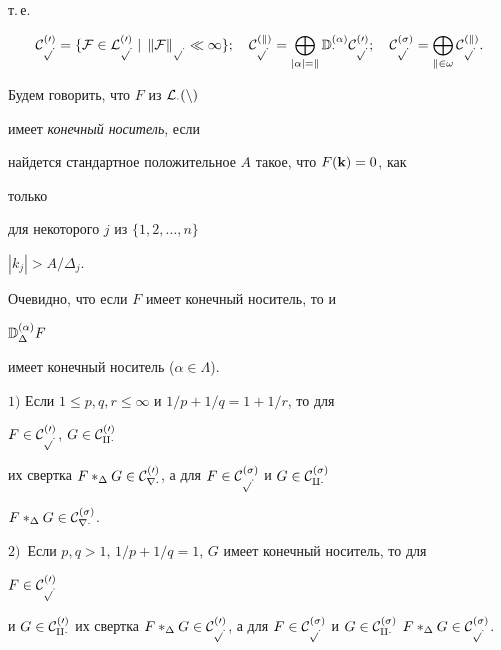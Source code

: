 т.\,е. 


$$ 


\cal C^{(0)}_{p\Delta}=\{F\in\cal L^{(0)}_{p\Delta}\mid\, 


\|F\|_{p\Delta}\ll\infty\};\quad 


\cal C^{(k)}_{p\Delta}=\bigoplus_{|\alpha|=k} 


\Bbb D^{(\alpha)}_\Delta\cal C^{(0)}_{p\Delta};\quad 


\cal C^{(\sigma)}_{p\Delta}=\bigoplus_{k\in\omega} 


\cal C^{(k)}_{p\Delta}. 


$$ 


 


Будем говорить, что $F$ из $\cal L_\Delta(n)$ 


имеет {\it конечный носитель}, если 


найдется стандартное положительное $A$ такое, что $F(\bold k)=0$, как 


только 


для некоторого $j$ из $\{1,2,\dotsc,n\}$\; 


$|k_j|>A/\Delta_j$. 


 


Очевидно, что если $F$ имеет конечный носитель, то и 


$\Bbb D^{(\alpha)}_\Delta F$ 


имеет конечный носитель ($\alpha\in\Lambda$). 


 


\begin{prop} $1)$ Если $1\le p,q,r\le\infty$ и $1/p+1/q=1+1/r$, то для 


$F\in\cal C^{(0)}_{p\Delta}$, $G\in\cal C^{(0)}_{q\Delta}$ 


их свертка $F*_\Delta G\in\cal C^{(0)}_{r\Delta}$, а для $F\in\cal 


C^{(\sigma)}_{p\Delta}$ и $G\in\cal C^{(\sigma)}_{q\Delta}$\; 


$F*_\Delta G\in\cal C^{(\sigma)}_{r\Delta}$. 


$2)$~Если $p,q>1$, $1/p+1/q=1$, $G$ имеет конечный носитель, то для 


$F\in\cal C^{(0)}_{p\Delta}$ 


и $G\in\cal C^{(0)}_{q\Delta}$ их свертка $F*_\Delta G\in\cal 


C^{(0)}_{p\Delta}$, а для $F\in\cal C^{(\sigma)}_{p\Delta}$ и $G\in\cal 


C^{(\sigma)}_{q\Delta}$\; $F*_\Delta G\in\cal C^{(\sigma)}_{p\Delta}$. 


\end{prop} 



